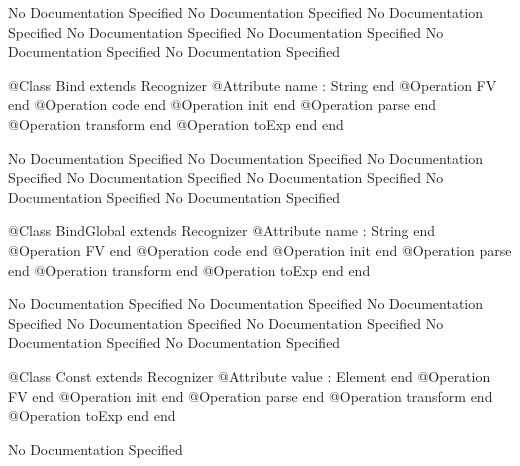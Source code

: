 No Documentation Specified
No Documentation Specified
No Documentation Specified
No Documentation Specified
No Documentation Specified
No Documentation Specified
No Documentation Specified
\begin{Interface}
@Class Bind extends Recognizer
  @Attribute name : String end
  @Operation FV end
  @Operation code end
  @Operation init end
  @Operation parse end
  @Operation transform end
  @Operation toExp end
end
\end{Interface}
No Documentation Specified
No Documentation Specified
No Documentation Specified
No Documentation Specified
No Documentation Specified
No Documentation Specified
No Documentation Specified
\begin{Interface}
@Class BindGlobal extends Recognizer
  @Attribute name : String end
  @Operation FV end
  @Operation code end
  @Operation init end
  @Operation parse end
  @Operation transform end
  @Operation toExp end
end
\end{Interface}
No Documentation Specified
No Documentation Specified
No Documentation Specified
No Documentation Specified
No Documentation Specified
No Documentation Specified
No Documentation Specified
\begin{Interface}
@Class Const extends Recognizer
  @Attribute value : Element end
  @Operation FV end
  @Operation init end
  @Operation parse end
  @Operation transform end
  @Operation toExp end
end
\end{Interface}
No Documentation Specified
